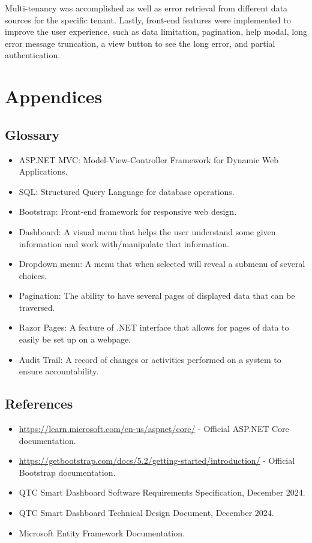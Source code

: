\documentclass[12pt]{article}
\begin{document}
Multi-tenancy was accomplished as well as error retrieval from different data sources for the specific tenant. Lastly, front-end features were implemented to improve the user experience, such as data limitation, pagination, help modal, long error message truncation, a view button to see the long error, and partial authentication.

\section{Appendices}
\subsection{Glossary}
\begin{itemize}
    \item ASP.NET MVC: Model-View-Controller Framework for Dynamic Web Applications.
    \item SQL: Structured Query Language for database operations.
    \item Bootstrap: Front-end framework for responsive web design.
    \item Dashboard: A visual menu that helps the user understand some given information and work with/manipulate that information.
    \item Dropdown menu: A menu that when selected will reveal a submenu of several choices.
    \item Pagination: The ability to have several pages of displayed data that can be traversed.
    \item Razor Pages: A feature of .NET interface that allows for pages of data to easily be set up on a webpage.
    \item Audit Trail: A record of changes or activities performed on a system to ensure accountability.
\end{itemize}

\subsection{References}
\begin{itemize}
    \item \url{https://learn.microsoft.com/en-us/aspnet/core/} - Official ASP.NET Core documentation.
    \item \url{https://getbootstrap.com/docs/5.2/getting-started/introduction/} - Official Bootstrap documentation.
    \item QTC Smart Dashboard Software Requirements Specification, December 2024.
    \item QTC Smart Dashboard Technical Design Document, December 2024.
    \item Microsoft Entity Framework Documentation.
\end{itemize}
\end{document}
